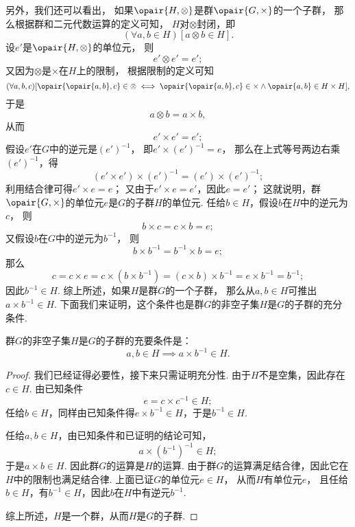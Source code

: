 另外，我们还可以看出，
如果\(\opair{H,\otimes}\)是群\(\opair{G,\times}\)的一个子群，
那么根据群和二元代数运算的定义可知，
\(H\)对\(\otimes\)封闭，即
\[
	(\forall a,b \in H)[a \otimes b \in H].
\]
设\(e'\)是\(\opair{H,\otimes}\)的单位元，
则\[
	e' \otimes e' = e';
\]
又因为\(\otimes\)是\(\times\)在\(H\)上的限制，
根据限制的定义可知
\[
	(\forall a,b,c)[
		\opair{\opair{a,b},c} \in \otimes
		\iff
		\opair{\opair{a,b},c} \in \times
		\land
		\opair{a,b} \in H \times H
	],
\]
于是\[
	a \otimes b = a \times b,
\]
从而\[
	e' \times e' = e';
\]
假设\(e'\)在\(G\)中的逆元是\((e')^{-1}\)，
即\(e' \times (e')^{-1} = e\)，
那么在上式等号两边右乘\((e')^{-1}\)，得\[
	(e' \times e') \times (e')^{-1} = (e') \times (e')^{-1};
\]
利用结合律可得\(e' \times e = e\)；
又由于\(e' \times e = e'\)，因此\(e = e'\)；
这就说明，群\(\opair{G,\times}\)的单位元\(e\)是\(G\)的子群\(H\)的单位元.
任给\(b \in H\)，假设\(b\)在\(H\)中的逆元为\(c\)，
则\[
	b \times c = c \times b = e;
\]
又假设\(b\)在\(G\)中的逆元为\(b^{-1}\)，
则\[
	b \times b^{-1} = b^{-1} \times b = e;
\]
那么\[
	c = c \times e
	= c \times (b \times b^{-1})
	= (c \times b) \times b^{-1}
	= e \times b^{-1}
	= b^{-1};
\]
因此\(b^{-1} \in H\).
综上所述，如果\(H\)是群\(G\)的一个子群，
那么从\(a,b \in H\)可推出\(a \times b^{-1} \in H\).
下面我们来证明，这个条件也是群\(G\)的非空子集\(H\)是\(G\)的子群的充分条件.
\begin{theorem}
群\(G\)的非空子集\(H\)是\(G\)的子群的充要条件是：\[
	a,b \in H \implies a \times b^{-1} \in H.
\]
\begin{proof}
我们已经证得必要性，接下来只需证明充分性.
由于\(H\)不是空集，因此存在\(c \in H\).
由已知条件\[
	e = c \times c^{-1} \in H;
\]
任给\(b \in H\)，同样由已知条件得\(e \times b^{-1} \in H\)，于是\(b^{-1} \in H\).

任给\(a,b \in H\)，由已知条件和已证明的结论可知，\[
	a \times (b^{-1})^{-1} \in H;
\]于是\(a \times b \in H\).
因此群\(G\)的运算是\(H\)的运算.
由于群\(G\)的运算满足结合律，因此它在\(H\)中的限制也满足结合律.
上面已证\(G\)的单位元\(e \in H\)，
从而\(H\)有单位元\(e\)，
且任给\(b \in H\)，有\(b^{-1} \in H\)，因此\(b\)在\(H\)中有逆元\(b^{-1}\).

综上所述，\(H\)是一个群，从而\(H\)是\(G\)的子群.
\end{proof}
\end{theorem}

